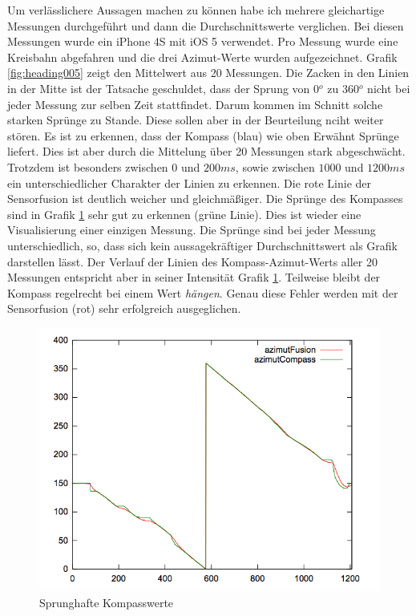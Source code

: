 Um verlässlichere Aussagen machen zu können habe ich mehrere gleichartige Messungen durchgeführt und dann die Durchschnittswerte verglichen. Bei diesen Messungen wurde ein iPhone 4S mit iOS 5 verwendet. Pro Messung wurde eine Kreisbahn abgefahren und die drei Azimut-Werte wurden aufgezeichnet. Grafik \ref{fig:heading005} zeigt den Mittelwert aus 20 Messungen. Die Zacken in den Linien in der Mitte ist der Tatsache geschuldet, dass der Sprung von 0$^o$ zu 360$^o$ nicht bei jeder Messung zur selben Zeit stattfindet. Darum kommen im Schnitt solche starken Sprünge zu Stande. Diese sollen aber in der Beurteilung nciht weiter stören. Es ist zu erkennen, dass der Kompass (blau) wie oben Erwähnt Sprünge liefert. Dies ist aber durch die Mittelung über 20 Messungen stark abgeschwächt. Trotzdem ist besonders zwischen $0$ und $200ms$, sowie zwischen $1000$ und $1200ms$ ein unterschiedlicher Charakter der Linien zu erkennen. Die rote Linie der Sensorfusion ist deutlich weicher und gleichmäßiger. Die Sprünge des Kompasses sind in Grafik \ref{fig:heading006} sehr gut zu erkennen (grüne Linie). Dies ist wieder eine Visualisierung einer einzigen Messung. Die Sprünge sind bei jeder Messung unterschiedlich, so, dass sich kein aussagekräftiger Durchschnittswert als Grafik darstellen lässt. Der Verlauf der Linien des Kompass-Azimut-Werts aller 20 Messungen entspricht aber in seiner Intensität Grafik \ref{fig:heading006}. Teilweise bleibt der Kompass regelrecht bei einem Wert \emph{hängen}. Genau diese Fehler werden mit der Sensorfusion (rot) sehr erfolgreich ausgeglichen.

\begin{figure}[htb]
\centering
\includegraphics[width=\textwidth]{figures/heading006}
\caption{Sprunghafte Kompasswerte}
\label{fig:heading006}
\end{figure}

